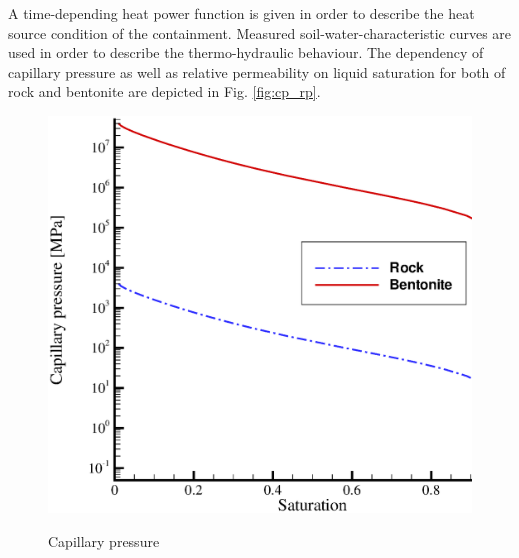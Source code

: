 A time-depending heat power function is given in order to describe
the heat source condition of the containment. Measured
soil-water-characteristic curves are used in order to describe the
thermo-hydraulic behaviour. The dependency of capillary pressure
as well as relative permeability on liquid saturation for both of
rock and bentonite are depicted in Fig. \ref{fig:cp_rp}.
\begin{figure}[!htb]
  \begin{center}
    \begin{minipage}[t]{0.45\textwidth}
      \begin{center}
        \includegraphics[scale=0.3]{THM/capsat_new.eps}\\
        \centerline{Capillary pressure}
      \end{center}
    \end{minipage}
    \begin{minipage}[t]{0.45\textwidth}
      \begin{center}

\end{center}
\end{minipage}
\end{center}
\end{figure}

